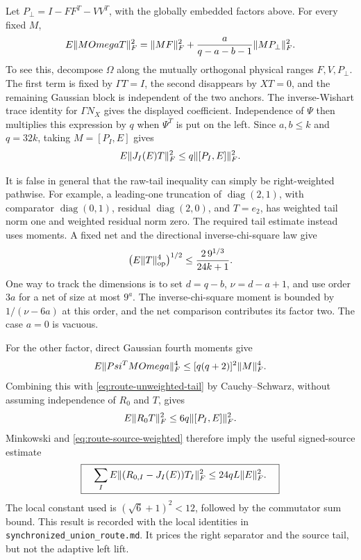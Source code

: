 \documentclass[11pt,oneside,openany,a4paper]{report}
\numberwithin{equation}{chapter}
\theoremstyle{definition}
\theoremstyle{remark}
\newcommand{\sourcefile}[1]{{\small\nolinkurl{#1}}}
\DeclareMathOperator{\diag}{diag}\DeclareMathOperator{\range}{range}
\begin{document}
Let $P_\perp=I-FF^T-VV^T$, with the globally embedded factors above.
For every fixed $M$,
\begin{equation}
 E\lVert MOmega T\rVert_F^2
 =\lVert MF\rVert_F^2+
   \frac{a}{q-a-b-1}\lVert MP_\perp\rVert_F^2.
 \label{eq:route-fixed-separator-moment}
\end{equation}
To see this, decompose $\Omega$ along the mutually orthogonal physical
ranges $F,V,P_\perp$.  The first term is fixed by $\Gamma T=I$, the
second disappears by $XT=0$, and the remaining Gaussian block is
independent of the two anchors.  The inverse-Wishart trace identity for
$\Gamma N_X$ gives the displayed coefficient.  Independence of $\Psi$
then multiplies this expression by $q$ when $\Psi^T$ is put on the left.
Since $a,b\leq k$ and $q=32k$, taking $M=[P_I,E]$ gives
\begin{equation}
 E\lVert J_I(E)T\rVert_F^2
 \leq q\lVert[P_I,E]\rVert_F^2.
 \label{eq:route-source-weighted}
\end{equation}

It is false in general that the raw-tail inequality can simply be
right-weighted pathwise.  For example, a leading-one truncation of
$\diag(2,1)$, with comparator $\diag(0,1)$, residual $\diag(2,0)$, and
$T=e_2$, has weighted tail norm one and weighted residual norm zero.
The required tail estimate instead uses moments.  A fixed net and the
directional inverse-chi-square law give
\[
 \bigl(E\lVert T\rVert_{\mathrm{op}}^4\bigr)^{1/2}
 \leq\frac{2\,9^{1/3}}{24k+1}.
\]
One way to track the dimensions is to set
$d=q-b$, $\nu=d-a+1$, and use order $3a$ for a net of size at most
$9^a$.  The inverse-chi-square moment is bounded by
$1/(\nu-6a)$ at this order, and the net comparison contributes its
factor two.  The case $a=0$ is vacuous.

For the other factor, direct Gaussian fourth moments give
\[
 E\lVert Psi^TMOmega\rVert_F^4
 \leq[q(q+2)]^2\lVert M\rVert_F^4.
\]
Combining this with \eqref{eq:route-unweighted-tail} by
Cauchy--Schwarz, without assuming independence of $R_0$ and $T$, gives
\[
 E\lVert R_0T\rVert_F^2
 \leq6q\lVert[P_I,E]\rVert_F^2.
\]
Minkowski and \eqref{eq:route-source-weighted} therefore imply the
useful signed-source estimate
\begin{equation}
 \boxed{\quad
 \sum_IE\lVert(R_{0,I}-J_I(E))T_I\rVert_F^2
 \leq24qL\lVert E\rVert_F^2.
 \quad}
 \label{eq:route-24q}
\end{equation}
The local constant used is
$(\sqrt6+1)^2<12$, followed by the commutator sum bound.  This result
is recorded with the local identities in
\sourcefile{synchronized_union_route.md}.  It prices the right
separator and the source tail, but not the adaptive left lift.
\end{document}
